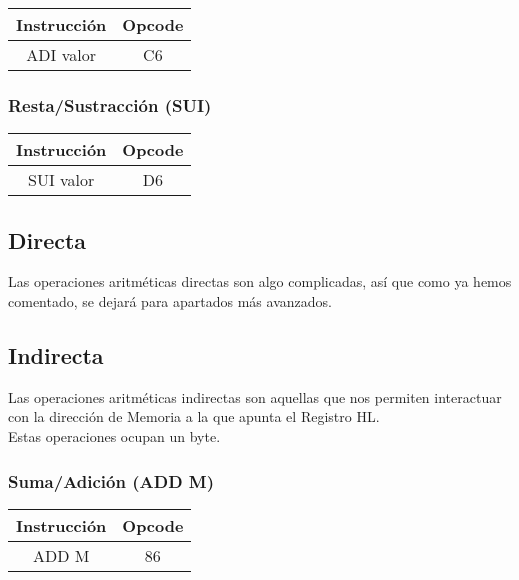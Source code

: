 \documentclass[12pt]{article}
\begin{document}
				\begin{table}[H]
					\centering
					\begin{tabular}{c|c}
						Instrucción & Opcode \\
						\midrule
						ADI valor & C6 \\
					\end{tabular}
				\end{table}
				
			\subsubsection{Resta/Sustracción (SUI)}
			
				\begin{table}[H]
					\centering
					\begin{tabular}{c|c}
						Instrucción & Opcode \\
						\midrule
						SUI valor & D6 \\
					\end{tabular}
				\end{table}
			
		\subsection{Directa}
	
			Las operaciones aritméticas directas son algo complicadas, así que como ya hemos comentado, se dejará para apartados más avanzados.\\
			
		\subsection{Indirecta}
		
			Las operaciones aritméticas indirectas son aquellas que nos permiten interactuar con la dirección de Memoria a la que apunta el Registro HL.\\
			
			Estas operaciones ocupan un byte.\\
			
			\subsubsection{Suma/Adición (ADD M)}
			
				\begin{table}[H]
					\centering
					\begin{tabular}{c|c}
						Instrucción & Opcode \\
						\midrule
						ADD M & 86 \\
					\end{tabular}
				\end{table}
				
\end{document}

